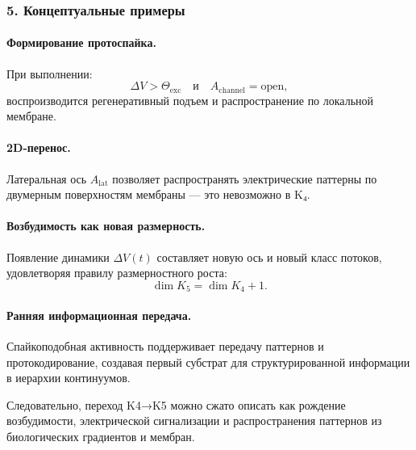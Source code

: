 \subsubsection{5. Концептуальные примеры}

\paragraph{Формирование протоспайка.}
При выполнении:
\[
\Delta V > \Theta_{\mathrm{exc}}
\quad\text{и}\quad
A_{\mathrm{channel}} = \text{open},
\]
воспроизводится регенеративный подъем и распространение по локальной мембране.

\paragraph{2D-перенос.}
Латеральная ось $A_{\mathrm{lat}}$ позволяет распространять электрические
паттерны по двумерным поверхностям мембраны — это невозможно в K₄.

\paragraph{Возбудимость как новая размерность.}
Появление динамики $\Delta V(t)$ составляет новую ось и новый класс потоков,
удовлетворяя правилу размерностного роста:
\[
\dim K_5 = \dim K_4 + 1.
\]

\paragraph{Ранняя информационная передача.}
Спайкоподобная активность поддерживает передачу паттернов и протокодирование,
создавая первый субстрат для структурированной информации в иерархии континуумов.

Следовательно, переход K4→K5 можно сжато описать как рождение
возбудимости, электрической сигнализации и распространения паттернов из
биологических градиентов и мембран.
